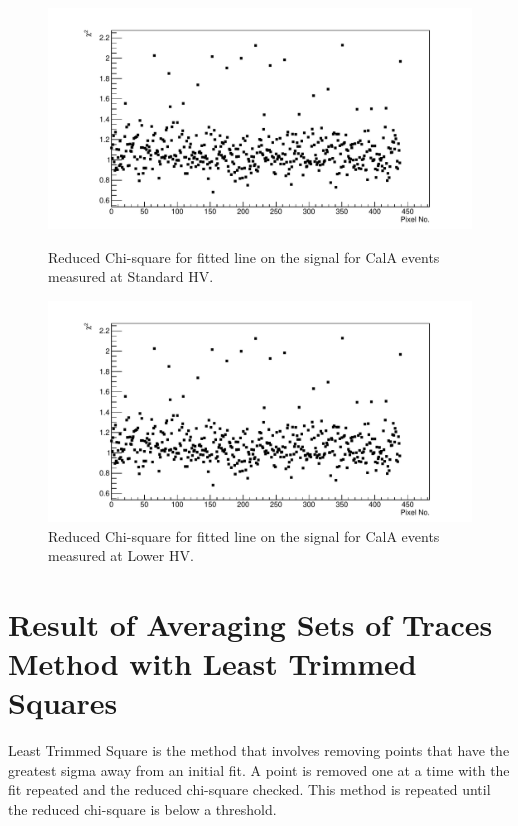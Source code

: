 \begin{figure}%
\includegraphics[width=\textwidth]{chapters/graphs/GainVarsMeas/LL_m04_2016-06-11/Set0and2/Chi2_AverageMethod_Noise_StandHV.pdf}
\caption{Reduced Chi-square for fitted line on the signal for CalA events measured at Standard HV.}\label{fig:Chi2VsPixel_Noise_StandHV_Average}
\vspace{3mm}
\includegraphics[width=\textwidth]{chapters/graphs/GainVarsMeas/LL_m04_2016-06-11/Set0and2/Chi2_AverageMethod_Noise_LowHV.pdf}
\caption{Reduced Chi-square for fitted line on the signal for CalA events measured at Lower HV.}\label{fig:Chi2VsPixel_Noise_LowerHV_Average}
\end{figure}

\section{Result of Averaging Sets of Traces Method with Least Trimmed Squares}

Least Trimmed Square is the method that involves removing points that have the greatest sigma away from an initial fit. A point is removed one at a time with the fit repeated and the reduced chi-square checked. This method is repeated until the reduced chi-square is below a threshold.


